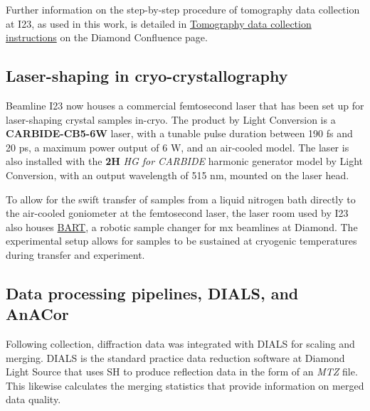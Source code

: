 Further information on the step-by-step procedure of tomography data collection at I23, as used in this work, is detailed in \href{https://confluence.diamond.ac.uk/x/h4HVDQ}{Tomography data collection instructions} on the Diamond Confluence page.

\subsection{Laser-shaping in cryo-crystallography}
Beamline I23 now houses a commercial femtosecond laser  that has been set up for laser-shaping crystal samples in-cryo. The product by Light Conversion is a \textbf{CARBIDE-CB5-6W} laser, with a tunable pulse duration between 190 \unit{fs} and 20 \unit{ps}, a maximum power output of 6 \unit{W}, and an air-cooled model. The laser is also installed with the \textbf{2H} \textit{HG for CARBIDE} harmonic generator model by Light Conversion, with an output wavelength of 515 \unit{nm}, mounted on the laser head.

To allow for the swift transfer of samples from a liquid nitrogen bath directly to the air-cooled goniometer at the femtosecond laser, the laser room used by I23 also houses \href{https://www.diamond.ac.uk/Home/Corporate-Literature/Annual-Review/Review2015/Villages/Macromolecular-Crystallography-Village/Macromolecular-Crystallography-Village-Developments/BART---the-new-robotic-sample-changer-for-MX-beamlines-at-Diamond.html}{BART}, a robotic sample changer for \ac{mx} beamlines at Diamond. The experimental setup allows for samples to be sustained at cryogenic temperatures during transfer and experiment.

\subsection{Data processing pipelines, DIALS, and AnACor}

Following collection, diffraction data was integrated with DIALS for scaling and merging. DIALS is the standard practice data reduction software at Diamond Light Source that uses SH to produce reflection data in the form of an \textit{MTZ} file. This likewise calculates the merging statistics that provide information on merged data quality.%

